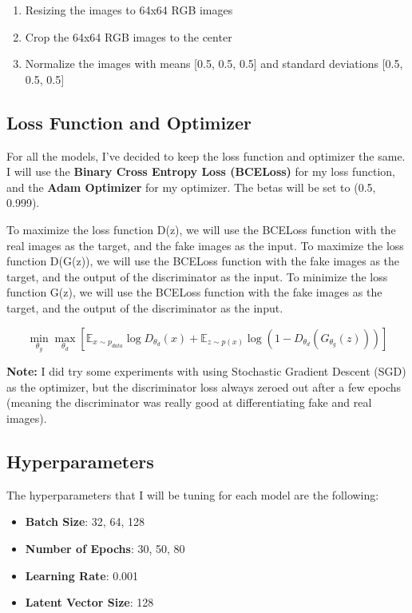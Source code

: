 \documentclass[twoside,11pt]{article}
\begin{document}
\begin{enumerate}
  \item Resizing the images to 64x64 RGB images
  \item Crop the 64x64 RGB images to the center
  \item Normalize the images with means [0.5, 0.5, 0.5] and standard deviations [0.5, 0.5, 0.5]
\end{enumerate}

\subsection{Loss Function and Optimizer}

For all the models, I've decided to keep the loss function and optimizer the same. I will use the \textbf{Binary Cross Entropy Loss (BCELoss)} for my loss function, and the \textbf{Adam Optimizer} for my optimizer. The betas will be set to (0.5, 0.999).

To maximize the loss function D(z), we will use the BCELoss function with the real images as the target, and the fake images as the input. To maximize the loss function D(G(z)), we will use the BCELoss function with the fake images as the target, and the output of the discriminator as the input. To minimize the loss function G(z), we will use the BCELoss function with the fake images as the target, and the output of the discriminator as the input.

$$\min_{\theta_g}\max_{\theta_d}[\mathbb{E}_{x\sim p_{data}}\log D_{\theta_d}(x) + \mathbb{E}_{z\sim p(x)} \log(1-D_{\theta_d}(G_{\theta_g}(z)))]$$

\textbf{Note:} I did try some experiments with using Stochastic Gradient Descent (SGD) as the optimizer, but the discriminator loss always zeroed out after a few epochs (meaning the discriminator was really good at differentiating fake and real images). 

\subsection{Hyperparameters}

The hyperparameters that I will be tuning for each model are the following:

\begin{itemize}
  \item \textbf{Batch Size}: 32, 64, 128
  \item \textbf{Number of Epochs}: 30, 50, 80
  \item \textbf{Learning Rate}: 0.001
  \item \textbf{Latent Vector Size}: 128
\end{itemize}
\end{document}
